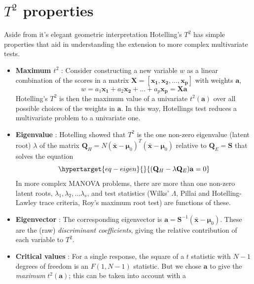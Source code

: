 \documentclass[
  letterpaper,
  10pt,
  krantz2]{krantz}
\begin{document}
\hypertarget{t2-properties}{%
\section{\texorpdfstring{\(T^2\)
properties}{T\^{}2 properties}}\label{t2-properties}}

Aside from it's elegant geometric interpretation Hotelling's \(T^2\) has
simple properties that aid in understanding the extension to more
complex multivariate tests.

\begin{itemize}
\item
  \textbf{Maximum \(t^2\)} : Consider constructing a new variable \(w\)
  as a linear combination of the scores in a matrix
  \(\mathbf{X} = [ \mathbf{x_1}, \mathbf{x_2}, \dots, \mathbf{x_p}]\)
  with weights \(\mathbf{a}\), \[
  w = a_1 \mathbf{x_1} + a_2 \mathbf{x_2} + \dots + a_p \mathbf{x_p} = \mathbf{X} \mathbf{a}
  \] Hotelling's \(T^2\) is then the maximum value of a univariate
  \(t^2 (\mathbf{a})\) over all possible choices of the weights in
  \(\mathbf{a}\). In this way, Hotellings test reduces a multivariate
  problem to a univariate one.
\item
  \textbf{Eigenvalue} : Hotelling showed that \(T^2\) is the one
  non-zero eigenvalue (latent root) \(\lambda\) of the matrix
  \(\mathbf{Q}_H = N (\bar{\mathbf{x}} - \mathbf{\mu}_0)^T (\bar{\mathbf{x}} - \mathbf{\mu}_0)\)
  relative to \(\mathbf{Q}_E = \mathbf{S}\) that solves the equation
  \begin{equation}\protect\hypertarget{eq-eigen}{}{
  (\mathbf{Q}_H - \lambda \mathbf{Q}_E) \mathbf{a} = 0
  }\label{eq-eigen}\end{equation} In more complex MANOVA problems, there
  are more than one non-zero latent roots,
  \(\lambda_1, \lambda_2, \dots \lambda_s\), and test statistics (Wilks'
  \(\Lambda\), Pillai and Hotelling-Lawley trace criteria, Roy's maximum
  root test) are functions of these.
\item
  \textbf{Eigenvector} : The corresponding eigenvector is
  \(\mathbf{a} = \mathbf{S}^{-1} (\bar{\mathbf{x}} - \mathbf{\mu}_0)\).
  These are the (raw) \emph{discriminant coefficients}, giving the
  relative contribution of each variable to \(T^2\).
\item
  \textbf{Critical values} : For a single response, the square of a
  \(t\) statistic with \(N-1\) degrees of freedom is an \(F (1, N-1)\)
  statistic. But we chose \(\mathbf{a}\) to give the \emph{maximum}
  \(t^2 (\mathbf{a})\); this can be taken into account with a

\end{itemize}
\end{document}
